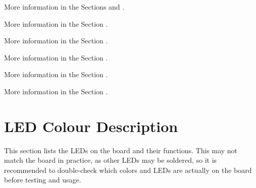 \documentclass[10pt]{datasheet}
\begin{document}
\begin{table}[h]
\begin{threeparttable}
\begin{tablenotes}
\item[1] {More information in the Sections  and .}
\item[2] {More information in the Section .}
\item[3] {More information in the Section .}
\item[4] {More information in the Section .}
\item[5] {More information in the Section .}
\item[6] {More information in the Section .}
\end{tablenotes}
\end{threeparttable}
\end{table}
\newpage
\section{LED Colour Description}
This section lists the LEDs on the board and their functions. This may not match the board in practice, as other LEDs may be soldered, so it is recommended to double-check which colors and LEDs are actually on the board before testing and usage.
\label{ssec:led_code}
\end{document}
